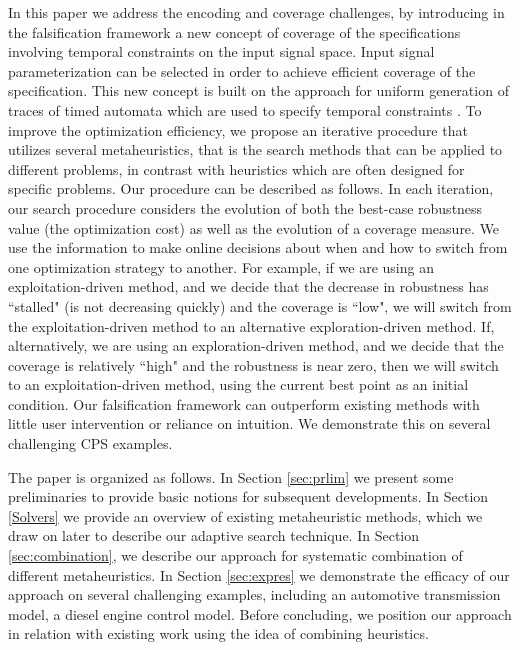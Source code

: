 In this paper we address the encoding and coverage challenges, by introducing in the falsification framework a new concept of
coverage of the specifications involving temporal constraints on the input signal space. Input signal parameterization can be selected in order to achieve
efficient coverage of the specification. This new concept is built on the approach for uniform
generation of traces of timed automata which are used to specify temporal constraints \cite{BBBK16}. To improve the optimization efficiency, we propose an iterative procedure that utilizes several
metaheuristics, that is the search methods that can be applied to
different problems, in contrast with heuristics which are often
designed for specific problems. Our procedure can be described as follows. 
In each iteration, our
search procedure considers the evolution of both the best-case
robustness value (the optimization cost) as well as the evolution of a
coverage measure.  We use the information to make online decisions
about when and how to switch from one optimization strategy to
another.  For example, if we are using an exploitation-driven method,
and we decide that the decrease in robustness has ``stalled" (is not
decreasing quickly) and the coverage is ``low", we will switch from
the exploitation-driven method to an alternative exploration-driven
method.  If, alternatively, we are using an exploration-driven method,
and we decide that the coverage is relatively ``high" and the
robustness is near zero, then we will switch to an exploitation-driven
method, using the current best point as an initial condition. 
Our falsification framework can outperform existing methods with little user intervention or reliance on intuition. We demonstrate this on several 
challenging CPS examples.

The paper is organized as follows. In Section \ref{sec:prlim} we present some preliminaries to provide basic notions for subsequent developments. In Section \ref{Solvers} we provide an overview of existing metaheuristic methods, which we draw on later to describe our adaptive search technique.
 In Section \ref{sec:combination}, we describe our approach for systematic combination of different metaheuristics. In Section \ref{sec:expres} we demonstrate the efficacy of our approach on several challenging examples, including an automotive transmission model, a diesel engine control model. Before concluding, we position our approach in relation with existing work using the idea of combining heuristics. 
